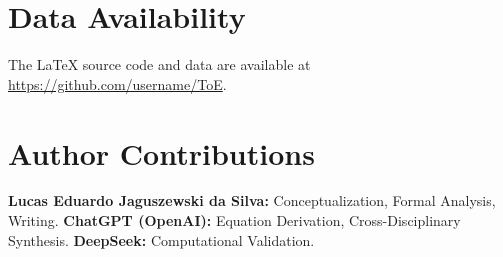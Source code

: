 \documentclass[12pt, a4paper]{article}
\begin{document}
\section*{Data Availability}
The LaTeX source code and data are available at \url{https://github.com/username/ToE}.

\section*{Author Contributions}
\textbf{Lucas Eduardo Jaguszewski da Silva:} Conceptualization, Formal Analysis, Writing.  
\textbf{ChatGPT (OpenAI):} Equation Derivation, Cross-Disciplinary Synthesis.  
\textbf{DeepSeek:} Computational Validation.



\end{document}
